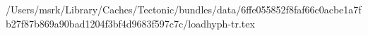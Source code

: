 /Users/msrk/Library/Caches/Tectonic/bundles/data/6ffe055852f8faf66c0acbe1a7fb27f87b869a90bad1204f3bf4d9683f597c7c/loadhyph-tr.tex